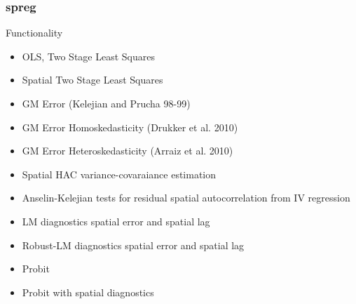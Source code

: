\documentclass{beamer}
\begin{document}
\begin{frame}\frametitle{spreg}
  \begin{block}{Functionality}
    \begin{itemize}
      \item OLS, Two Stage Least Squares
      \item Spatial Two Stage Least Squares
      \item GM Error (Kelejian and Prucha 98-99)
      \item GM Error Homoskedasticity (Drukker et al. 2010)
      \item GM Error Heteroskedasticity (Arraiz et al. 2010)
      \item Spatial HAC variance-covaraiance estimation
      \item Anselin-Kelejian tests for residual spatial autocorrelation from
        IV regression
      \item LM diagnostics spatial error and spatial lag
      \item Robust-LM diagnostics spatial error and spatial lag
      \item Probit
      \item Probit with spatial diagnostics
    \end{itemize}
  
  \end{block}
\end{frame}
\end{document}
